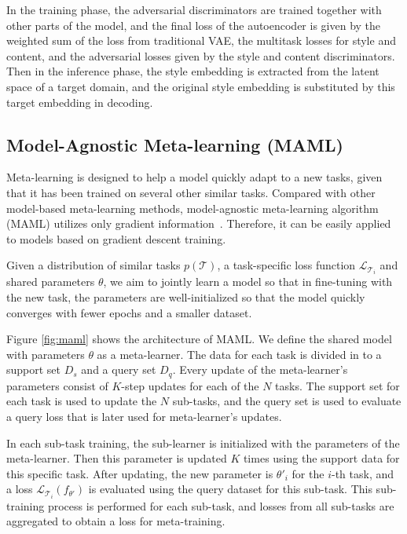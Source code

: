 In the training phase, the adversarial discriminators are trained 
together with other parts of the model, and the final loss of 
the autoencoder is given by the weighted sum of the loss from traditional VAE, 
the multitask losses for style and content, 
and the adversarial losses given by the style and content discriminators. 
Then in the inference phase, the style embedding is extracted from the 
latent space of a target domain, and the original style embedding is 
substituted by this target embedding in decoding.

\subsection*{Model-Agnostic Meta-learning (MAML)}

Meta-learning is designed to help a model quickly adapt to a new tasks, given that it has been trained on several other similar tasks. Compared with other model-based meta-learning methods, model-agnostic meta-learning algorithm (MAML) utilizes only gradient information~\cite{finn2017model}. Therefore, it can be easily applied to models based on gradient descent training.

Given a distribution of similar tasks $p(\mathcal{T})$, a task-specific loss function $\mathcal{L}_{\mathcal{T}_i}$ and shared parameters $\theta$, we aim to jointly learn a model so that in fine-tuning with the new task, the parameters are well-initialized so that the model quickly converges with fewer epochs and a smaller dataset.

Figure \ref{fig:maml} shows the architecture of MAML. We define the shared model with parameters $\theta$ as a meta-learner. The data for each task is divided in to a support set $D_s$ and a query set $D_q$. Every update of the meta-learner's parameters consist of $K$-step updates for each of the $N$ tasks. The support set for each task is used to update the $N$ sub-tasks, and the query set is used to evaluate a query loss that is later used for meta-learner's updates.

In each sub-task training, the sub-learner is initialized with the parameters of the meta-learner. Then this parameter is updated $K$ times using the support data for this specific task. After updating, the new parameter is $\theta'_i$ for the $i$-th task, and a loss $\mathcal{L}_{\mathcal{T}_i}(f_{\theta'})$ is evaluated using the query dataset for this sub-task. This sub-training process is performed for each sub-task, and losses from all sub-tasks are aggregated to obtain a loss for meta-training.

